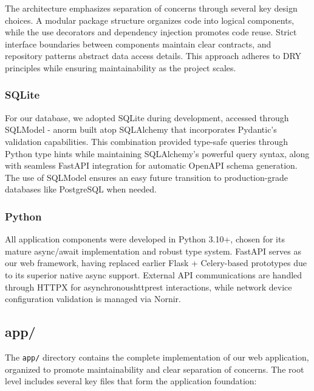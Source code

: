         The architecture emphasizes separation of concerns through several key design choices. A modular package structure 
        organizes code into logical components, while the use decorators and dependency injection promotes code reuse. 
        Strict interface boundaries between components maintain clear contracts, and repository patterns abstract data 
        access details. This approach adheres to DRY principles while ensuring maintainability as the project scales.

        \subsubsection{SQLite}
            For our database, we adopted SQLite during development, accessed through SQLModel - an\ac{orm} built atop SQLAlchemy 
            that incorporates Pydantic's validation capabilities. This combination provided type-safe queries through Python type 
            hints while maintaining SQLAlchemy's powerful query syntax, along with seamless FastAPI integration for automatic 
            OpenAPI schema generation. The use of SQLModel ensures an easy future transition to production-grade databases 
            like PostgreSQL when needed.

        \subsubsection{Python}

            All application components were developed in Python 3.10+, chosen for its mature async/await implementation and 
            robust type system. FastAPI serves as our web framework, having replaced earlier Flask + Celery-based prototypes 
            due to its superior native async support. External API communications are handled through HTTPX for 
            asynchronous\ac{http}\ac{rest} interactions, while network device configuration validation is managed via Nornir.

    \subsection{app/}

        The \texttt{app/} directory contains the complete implementation of our web application, organized to promote 
        maintainability and clear separation of concerns. The root level includes several key files that form the 
        application foundation:

